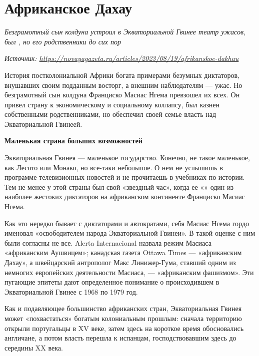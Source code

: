 \newpage




\section{Африканское Дахау}

\textit{Безграмотный сын колдуна устроил в Экваториальной Гвинее театр ужасов, был , но его родственники  до сих пор}

\textit{Источник: \url{https://novayagazeta.ru/articles/2023/08/19/afrikanskoe-dakhau}}

История постколониальной Африки богата примерами безумных диктаторов, внушавших своим подданным восторг, а внешним наблюдателям --- ужас. Но безграмотный сын колдуна Франциско Масиас Нгема превзошел их всех. Он привел страну к экономическому и социальному коллапсу, был казнен собственными родственниками, но обеспечил своей семье власть над Экваториальной Гвинеей.

\textbf{Маленькая страна больших возможностей}

Экваториальная Гвинея --- маленькое государство. Конечно, не такое маленькое, как Лесото или Монако, но все-таки небольшое. О нем не услышишь в программе телевизионных новостей и не прочитаешь в учебниках по истории. Тем не менее у этой страны был свой «звездный час», когда ее «» один из наиболее жестоких диктаторов на африканском континенте Франциско Масиас Нгема.

Как это нередко бывает с диктаторами и автократами, себя Масиас Нгема гордо именовал «освободителем народа Экваториальной Гвинеи». В такой оценке с ним были согласны не все.  Alerta Internacional назвала режим Масиаса «африканским Аушвицем»; канадская газета Ottawa Times --- «африканским Дахау», а швейцарский антрополог Макс Линижер-Гума, ставший одним из немногих европейских  деятельности Масиаса, --- «африканским фашизмом». Эти пугающие эпитеты дают определенное понимание о происходившем в Экваториальной Гвинее с 1968 по 1979 год.

Как и подавляющее большинство африканских стран, Экваториальная Гвинея может «похвастаться» богатым колониальным прошлым: сначала территорию открыли португальцы в XV веке, затем здесь на короткое время обосновались англичане, а потом власть перешла к испанцам, господствовавшим здесь до середины XX века.

